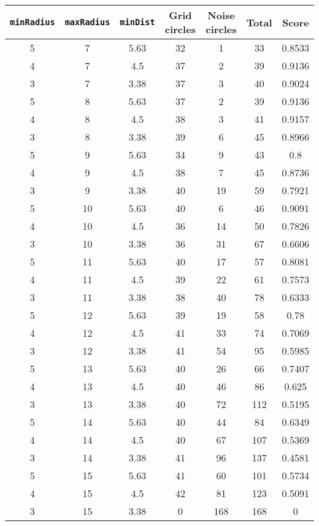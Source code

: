 \documentclass[letterpaper, 12pt]{article}
\begin{document}
\begin{longtable}{|c|c|c|c|c|c|c|}
\hline
\textbf{\texttt{minRadius}} & \textbf{\texttt{maxRadius}} & \textbf{\texttt{minDist}} & \textbf{Grid circles} & \textbf{Noise circles} & \textbf{Total} & \textbf{Score} \\
\hline
5 & 7 & 5.63 & 32 & 1 & 33 & 0.8533 \\
\hline
4 & 7 & 4.5 & 37 & 2 & 39 & 0.9136 \\
\hline
3 & 7 & 3.38 & 37 & 3 & 40 & 0.9024 \\
\hline
5 & 8 & 5.63 & 37 & 2 & 39 & 0.9136 \\
\hline
4 & 8 & 4.5 & 38 & 3 & 41 & 0.9157 \\
\hline
3 & 8 & 3.38 & 39 & 6 & 45 & 0.8966 \\
\hline
5 & 9 & 5.63 & 34 & 9 & 43 & 0.8 \\
\hline
4 & 9 & 4.5 & 38 & 7 & 45 & 0.8736 \\
\hline
3 & 9 & 3.38 & 40 & 19 & 59 & 0.7921 \\
\hline
5 & 10 & 5.63 & 40 & 6 & 46 & 0.9091 \\
\hline
4 & 10 & 4.5 & 36 & 14 & 50 & 0.7826 \\
\hline
3 & 10 & 3.38 & 36 & 31 & 67 & 0.6606 \\
\hline
5 & 11 & 5.63 & 40 & 17 & 57 & 0.8081 \\
\hline
4 & 11 & 4.5 & 39 & 22 & 61 & 0.7573 \\
\hline
3 & 11 & 3.38 & 38 & 40 & 78 & 0.6333 \\
\hline
5 & 12 & 5.63 & 39 & 19 & 58 & 0.78 \\
\hline
4 & 12 & 4.5 & 41 & 33 & 74 & 0.7069 \\
\hline
3 & 12 & 3.38 & 41 & 54 & 95 & 0.5985 \\
\hline
5 & 13 & 5.63 & 40 & 26 & 66 & 0.7407 \\
\hline
4 & 13 & 4.5 & 40 & 46 & 86 & 0.625 \\
\hline
3 & 13 & 3.38 & 40 & 72 & 112 & 0.5195 \\
\hline
5 & 14 & 5.63 & 40 & 44 & 84 & 0.6349 \\
\hline
4 & 14 & 4.5 & 40 & 67 & 107 & 0.5369 \\
\hline
3 & 14 & 3.38 & 41 & 96 & 137 & 0.4581 \\
\hline
5 & 15 & 5.63 & 41 & 60 & 101 & 0.5734 \\
\hline
4 & 15 & 4.5 & 42 & 81 & 123 & 0.5091 \\
\hline
3 & 15 & 3.38 & 0 & 168 & 168 & 0 \\

\end{longtable}
\end{document}
